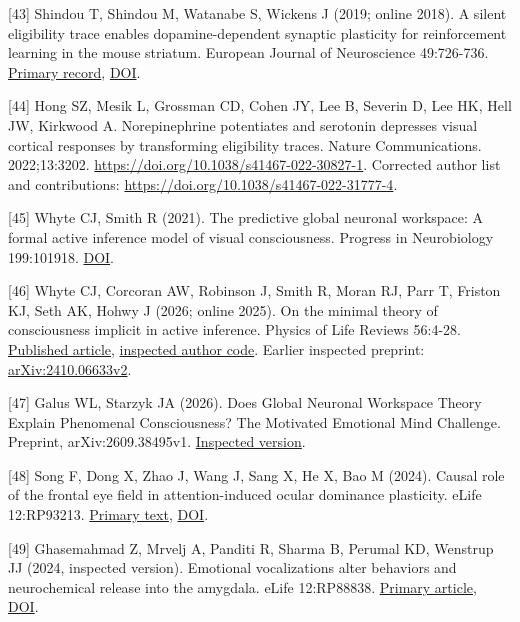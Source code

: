 \documentclass[
  american,
  11pt,
  letterpaper,
]{article}
\begin{document}
{[}43{]} Shindou T, Shindou M, Watanabe S, Wickens J (2019; online 2018). A silent eligibility trace enables dopamine-dependent synaptic plasticity for reinforcement learning in the mouse striatum. European Journal of Neuroscience 49:726-736. \href{https://pubmed.ncbi.nlm.nih.gov/29603470/}{Primary record}, \href{https://doi.org/10.1111/ejn.13921}{DOI}.

{[}44{]} Hong SZ, Mesik L, Grossman CD, Cohen JY, Lee B, Severin D, Lee HK, Hell JW, Kirkwood A. Norepinephrine potentiates and serotonin depresses visual cortical responses by transforming eligibility traces. Nature Communications. 2022;13:3202. \url{https://doi.org/10.1038/s41467-022-30827-1}. Corrected author list and contributions: \url{https://doi.org/10.1038/s41467-022-31777-4}.

{[}45{]} Whyte CJ, Smith R (2021). The predictive global neuronal workspace: A formal active inference model of visual consciousness. Progress in Neurobiology 199:101918. \href{https://doi.org/10.1016/j.pneurobio.2020.101918}{DOI}.

{[}46{]} Whyte CJ, Corcoran AW, Robinson J, Smith R, Moran RJ, Parr T, Friston KJ, Seth AK, Hohwy J (2026; online 2025). On the minimal theory of consciousness implicit in active inference. Physics of Life Reviews 56:4-28. \href{https://doi.org/10.1016/j.plrev.2025.11.002}{Published article}, \href{https://github.com/cjwhyte/ActInfMinConsTheory/tree/9ba97d4ab0e4c9210fbbf94e9675459ab57df18d}{inspected author code}. Earlier inspected preprint: \href{https://arxiv.org/abs/2410.06633v2}{arXiv:2410.06633v2}.

{[}47{]} Galus WL, Starzyk JA (2026). Does Global Neuronal Workspace Theory Explain Phenomenal Consciousness? The Motivated Emotional Mind Challenge. Preprint, arXiv:2609.38495v1. \href{https://arxiv.org/abs/2609.38495v1}{Inspected version}.

{[}48{]} Song F, Dong X, Zhao J, Wang J, Sang X, He X, Bao M (2024). Causal role of the frontal eye field in attention-induced ocular dominance plasticity. eLife 12:RP93213. \href{https://pmc.ncbi.nlm.nih.gov/articles/PMC10937035/}{Primary text}, \href{https://doi.org/10.7554/eLife.93213}{DOI}.

{[}49{]} Ghasemahmad Z, Mrvelj A, Panditi R, Sharma B, Perumal KD, Wenstrup JJ (2024, inspected version). Emotional vocalizations alter behaviors and neurochemical release into the amygdala. eLife 12:RP88838. \href{https://pmc.ncbi.nlm.nih.gov/articles/PMC11249735/}{Primary article}, \href{https://doi.org/10.7554/eLife.88838}{DOI}.
\end{document}

